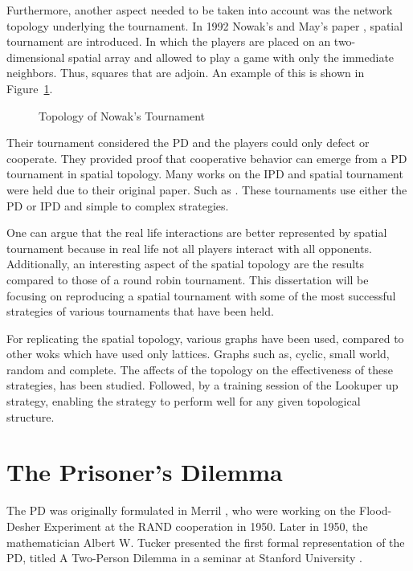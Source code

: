Furthermore, another aspect needed to be taken into account was the network
topology underlying the tournament. In 1992 Nowak's and May's paper \cite{Nowak1992},
spatial tournament are introduced. In which the players are placed on an two-
dimensional spatial array and allowed to play a game with only the immediate neighbors.
Thus, squares that are adjoin. An example of this is shown in Figure~\ref{fig:nowak-example}.

\begin{figure}[!hbtp]
	\centering
		
		\caption{Topology of Nowak's Tournament}
  \label{fig:nowak-example}
\end{figure}

Their tournament considered the PD and the players could only defect or
cooperate.  They provided proof that cooperative behavior can emerge from a PD
tournament in spatial topology. Many works on the IPD and spatial tournament
were held due to their original paper. Such as \cite{Grujic2014, Nowak1993,
Maciver1992, Nowak1992, Brauchli1999, Meng2015, Lindgren1994}.
These tournaments use either the PD or IPD and simple to complex strategies.

One can argue that the real life interactions are better represented by spatial
tournament because in real life not all players interact with all opponents.
Additionally, an interesting aspect of the spatial topology are the results
compared to those of a round robin tournament. This dissertation will be focusing on
reproducing a spatial tournament with some of the most successful strategies of
various tournaments that have been held.

For replicating the spatial topology, various graphs have been used, compared to
other woks which have used only lattices. Graphs such as, cyclic,
small world, random and complete. The affects of the topology on the
effectiveness of these strategies, has been studied. Followed, by a training
session of the Lookuper up strategy, enabling the strategy to perform well for
any given topological structure.

\section{The Prisoner's Dilemma}
The PD was originally formulated in Merril \cite{Flood1958},
who were working on the Flood-Desher Experiment at the RAND cooperation in 1950.
Later in 1950, the mathematician Albert W. Tucker presented the first formal
representation of the PD, titled  A Two-Person Dilemma in a seminar at
Stanford University \cite{GassAssad2005}.

